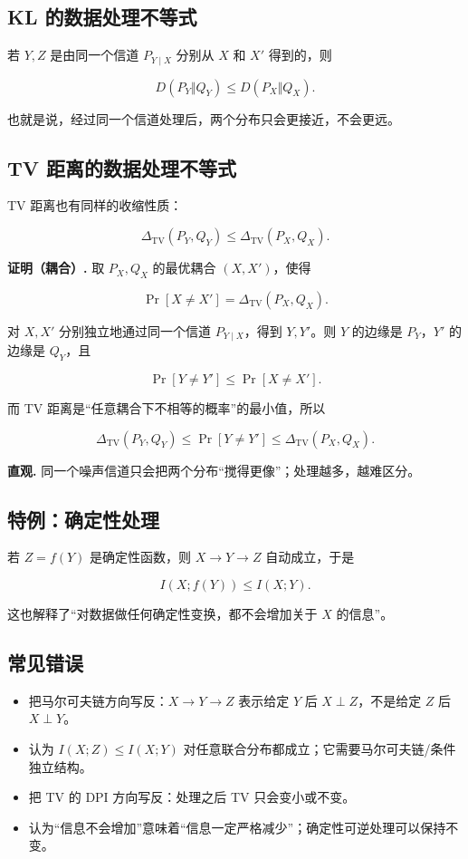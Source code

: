 \subsection{KL 的数据处理不等式}


若 $Y,Z$ 是由同一个信道 $P_{Y\mid X}$ 分别从 $X$ 和 $X'$ 得到的，则

\[
D(P_Y\Vert Q_Y)\le D(P_X\Vert Q_X).
\]

也就是说，经过同一个信道处理后，两个分布只会更接近，不会更远。

\subsection{TV 距离的数据处理不等式}


TV 距离也有同样的收缩性质：

\[
\boxed{
\Delta_{\mathrm{TV}}(P_Y,Q_Y)
\le
\Delta_{\mathrm{TV}}(P_X,Q_X)
}.
\]

\textbf{证明（耦合）.} 取 $P_X,Q_X$ 的最优耦合 $(X,X')$，使得

\[
\Pr[X\ne X']=\Delta_{\mathrm{TV}}(P_X,Q_X).
\]

对 $X,X'$ 分别独立地通过同一个信道 $P_{Y\mid X}$，得到 $Y,Y'$。则 $Y$ 的边缘是 $P_Y$，$Y'$ 的边缘是 $Q_Y$，且

\[
\Pr[Y\ne Y']\le\Pr[X\ne X'].
\]

而 TV 距离是“任意耦合下不相等的概率”的最小值，所以

\[
\Delta_{\mathrm{TV}}(P_Y,Q_Y)
\le\Pr[Y\ne Y']
\le\Delta_{\mathrm{TV}}(P_X,Q_X).
\]

\textbf{直观.} 同一个噪声信道只会把两个分布“搅得更像”；处理越多，越难区分。

\subsection{特例：确定性处理}


若 $Z=f(Y)$ 是确定性函数，则 $X\to Y\to Z$ 自动成立，于是

\[
I(X;f(Y))\le I(X;Y).
\]

这也解释了“对数据做任何确定性变换，都不会增加关于 $X$ 的信息”。

\subsection{常见错误}


\begin{itemize}
\item 把马尔可夫链方向写反：$X\to Y\to Z$ 表示给定 $Y$ 后 $X\perp Z$，不是给定 $Z$ 后 $X\perp Y$。
\item 认为 $I(X;Z)\le I(X;Y)$ 对任意联合分布都成立；它需要马尔可夫链/条件独立结构。
\item 把 TV 的 DPI 方向写反：处理之后 TV 只会变小或不变。
\item 认为“信息不会增加”意味着“信息一定严格减少”；确定性可逆处理可以保持不变。
\end{itemize}
